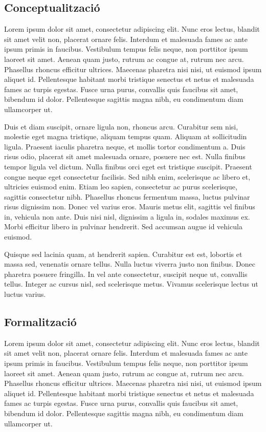 \documentclass[11pt,a4paper]{article}
\begin{document}
\subsection{Conceptualització}
Lorem ipsum dolor sit amet, consectetur adipiscing elit. Nunc eros lectus, blandit sit amet velit non, placerat ornare felis. Interdum et malesuada fames ac ante ipsum primis in faucibus. Vestibulum tempus felis neque, non porttitor ipsum laoreet sit amet. Aenean quam justo, rutrum ac congue at, rutrum nec arcu. Phasellus rhoncus efficitur ultrices. Maecenas pharetra nisi nisi, ut euismod ipsum aliquet id. Pellentesque habitant morbi tristique senectus et netus et malesuada fames ac turpis egestas. Fusce urna purus, convallis quis faucibus sit amet, bibendum id dolor. Pellentesque sagittis magna nibh, eu condimentum diam ullamcorper ut.

Duis et diam suscipit, ornare ligula non, rhoncus arcu. Curabitur sem nisi, molestie eget magna tristique, aliquam tempus quam. Aliquam at sollicitudin ligula. Praesent iaculis pharetra neque, et mollis tortor condimentum a. Duis risus odio, placerat sit amet malesuada ornare, posuere nec est. Nulla finibus tempor ligula vel dictum. Nulla finibus orci eget est tristique suscipit. Praesent congue neque eget consectetur facilisis. Sed nibh enim, scelerisque ac libero et, ultricies euismod enim. Etiam leo sapien, consectetur ac purus scelerisque, sagittis consectetur nibh. Phasellus rhoncus fermentum massa, luctus pulvinar risus dignissim non. Donec vel varius eros. Mauris metus elit, sagittis vel finibus in, vehicula non ante. Duis nisi nisl, dignissim a ligula in, sodales maximus ex. Morbi efficitur libero in pulvinar hendrerit. Sed accumsan augue id vehicula euismod.

Quisque sed lacinia quam, at hendrerit sapien. Curabitur est est, lobortis et massa sed, venenatis ornare tellus. Nulla luctus viverra justo non finibus. Donec pharetra posuere fringilla. In vel ante consectetur, suscipit neque ut, convallis tellus. Integer ac cursus nisl, sed scelerisque metus. Vivamus scelerisque lectus ut luctus varius.

\subsection{Formalització}
Lorem ipsum dolor sit amet, consectetur adipiscing elit. Nunc eros lectus, blandit sit amet velit non, placerat ornare felis. Interdum et malesuada fames ac ante ipsum primis in faucibus. Vestibulum tempus felis neque, non porttitor ipsum laoreet sit amet. Aenean quam justo, rutrum ac congue at, rutrum nec arcu. Phasellus rhoncus efficitur ultrices. Maecenas pharetra nisi nisi, ut euismod ipsum aliquet id. Pellentesque habitant morbi tristique senectus et netus et malesuada fames ac turpis egestas. Fusce urna purus, convallis quis faucibus sit amet, bibendum id dolor. Pellentesque sagittis magna nibh, eu condimentum diam ullamcorper ut.
\end{document}
